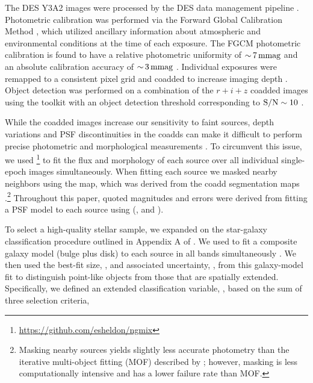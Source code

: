 \documentclass[twocolumn]{aastex61}
\begin{document}
The DES Y3A2 images were processed by the DES data management pipeline \citep{Morganson:2018}.
Photometric calibration was performed via the Forward Global Calibration Method \citep[FGCM;][]{Burke:2017}, which utilized ancillary information about atmospheric and environmental conditions at the time of each exposure.
The FGCM photometric calibration is found to have a relative photometric uniformity of $ {\sim}\, 7 \mathrm{\,mmag}$ \citep{Burke:2017} and an absolute calibration accuracy of $ {\sim}\, 3 \mathrm{\,mmag}$ \citep{DES:2018}.
Individual exposures were remapped to a consistent pixel grid and coadded to increase imaging depth \citep{Morganson:2018}.  
Object detection was performed on a combination of the $r + i + z$ coadded images using the \SExtractor toolkit \citep{Bertin:1996,Bertin:2002} with an object detection threshold corresponding to ${\rm S/N} \sim 10$ \citep{Morganson:2018}.

While the coadded images increase our sensitivity to faint sources, depth variations and PSF discontinuities in the coadds can make it difficult to perform precise photometric and morphological measurements \citep[\eg,][]{Drlica-Wagner:2017}.
To circumvent this issue, we used \ngmix\footnote{\url{https://github.com/esheldon/ngmix}} \citep{Sheldon:2014,Jarvis:2015,Drlica-Wagner:2017} to fit the flux and morphology of each source over all individual single-epoch images simultaneously.
When fitting each source we masked nearby neighbors using the  map, which was derived from the \sextractor coadd segmentation maps \citep[Section 5.2 of][]{Jarvis:2015}.\footnote{Masking nearby sources yields slightly less accurate photometry than the iterative multi-object fitting (MOF) described by \citet{Drlica-Wagner:2017}; however, masking is less computationally intensive and has a lower failure rate than MOF.}
Throughout this paper, quoted magnitudes and errors were derived from fitting a PSF model to each source using \ngmix (\ie,  and ).

To select a high-quality stellar sample, we expanded on the star-galaxy classification procedure outlined in Appendix A of \citet{Rozo:2016}.
We used \ngmix to fit a composite galaxy model (bulge plus disk) to each source  in all bands simultaneously \citep{Drlica-Wagner:2017}. 
We then used the best-fit size, , and associated uncertainty, , from this galaxy-model fit to distinguish point-like objects from those that are spatially extended.
Specifically, we defined an extended classification variable, , based on the sum of three selection criteria,
\end{document}
